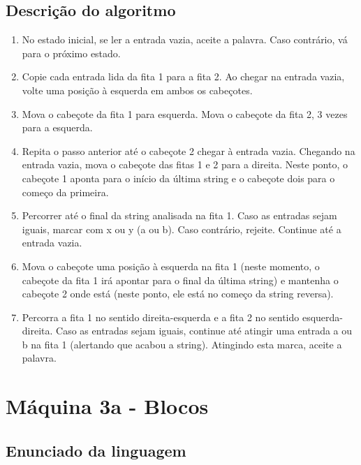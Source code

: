 \documentclass{article}
\begin{document}
    \subsection{Descrição do algoritmo}
        \begin{enumerate}
        \item No estado inicial, se ler a entrada vazia, aceite a palavra. Caso contrário, vá para o próximo estado.
        \item Copie cada entrada lida da fita 1 para a fita 2. Ao chegar na entrada vazia, volte uma posição à esquerda em ambos os cabeçotes.
        \item Mova o cabeçote da fita 1 para esquerda. Mova o cabeçote da fita 2, 3 vezes para a esquerda.
        \item Repita o passo anterior até o cabeçote 2 chegar à entrada vazia. Chegando na entrada vazia, mova o cabeçote das fitas 1 e 2 para a direita. Neste ponto, o cabeçote 1 aponta para o início da última string e o cabeçote dois para o começo da primeira.
        \item Percorrer até o final da string analisada na fita 1. Caso as entradas sejam iguais, marcar com x ou y (a ou b). Caso contrário, rejeite. Continue até a entrada vazia.
        \item Mova o cabeçote uma posição à esquerda na fita 1 (neste momento, o cabeçote da fita 1 irá apontar para o final da última string) e mantenha o cabeçote 2 onde está (neste ponto, ele está no começo da string reversa).
        \item Percorra a fita 1 no sentido direita-esquerda e a fita 2 no sentido esquerda-direita. Caso as entradas sejam iguais, continue até atingir uma entrada a ou b na fita 1 (alertando que acabou a string). Atingindo esta marca, aceite a palavra.
        \end{enumerate}
\section{Máquina 3a - Blocos}
    \subsection{Enunciado da linguagem}
\end{document}
